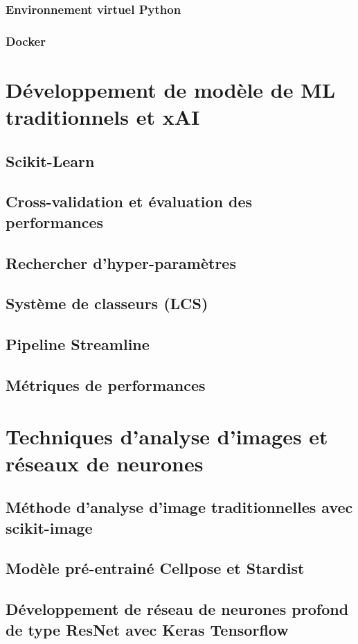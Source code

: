 \subsubsection{Environnement virtuel Python}
\subsubsection{Docker}
\section{Développement de modèle de ML traditionnels et xAI}
\subsection{Scikit-Learn}
\subsection{Cross-validation et évaluation des performances}
\subsection{Rechercher d'hyper-paramètres}
\subsection{Système de classeurs (LCS)}
\subsection{Pipeline Streamline}
\subsection{Métriques de performances}
\section{Techniques d'analyse d'images et réseaux de neurones}
\subsection{Méthode d'analyse d'image traditionnelles avec scikit-image}
\subsection{Modèle pré-entrainé Cellpose et Stardist}
\subsection{Développement de réseau de neurones profond de type ResNet avec Keras Tensorflow}
